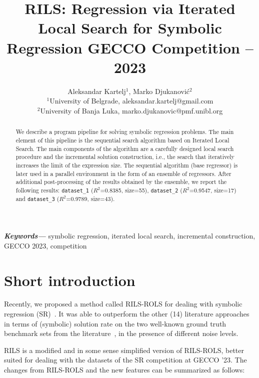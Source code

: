 \documentclass{article}
\title{{RILS}: Regression via Iterated Local Search for Symbolic Regression GECCO Competition -- 2023}
\author{Aleksandar Kartelj$^{1}$, Marko Djukanovi\'{c}$^{2}$  \\
        \small $^{1}$University of Belgrade, aleksandar.kartelj@gmail.com \\
        \small $^{2}$University of Banja Luka, marko.djukanovic@pmf.unibl.org \\
}
\date{}
\providecommand{\keywords}[1]
{
  \small	
  \textbf{\textit{Keywords---}} #1
}
\begin{document}
\maketitle

\begin{abstract} %
We describe a program pipeline for solving symbolic regression problems. The main element of this pipeline is the sequential search algorithm based on Iterated Local Search. The main components of the algorithm are a carefully designed local search procedure and the incremental solution construction, i.e., the search that iteratively increases the limit of the expression size. The sequential algorithm (base regressor) is later used in a parallel environment in the form of an ensemble of regressors.
After additional post-processing of the results obtained by the ensemble, we report the following results: \texttt{dataset\_1} ($R^2$=0.8385, size=55), \texttt{dataset\_2} ($R^2$=0.9547, size=17) and \texttt{dataset\_3} ($R^2$=0.9789, size=43).
\end{abstract}

\keywords{symbolic regression, iterated local search, incremental construction, GECCO 2023, competition}

\section{Short introduction}

Recently, we proposed a method called RILS-ROLS for dealing with symbolic regression (SR)~\cite{kartelj2023_rils_rols}. It was able to outperform the other (14) literature approaches in terms of (symbolic) solution rate on the two well-known ground truth benchmark sets from the literature~\cite{la2021contemporary}, in the presence of different noise levels.

RILS is a modified and in some sense simplified version of RILS-ROLS, better suited for dealing with the datasets of the SR competition at GECCO '23.
The changes from RILS-ROLS and the new features can be summarized as follows:
\end{document}
